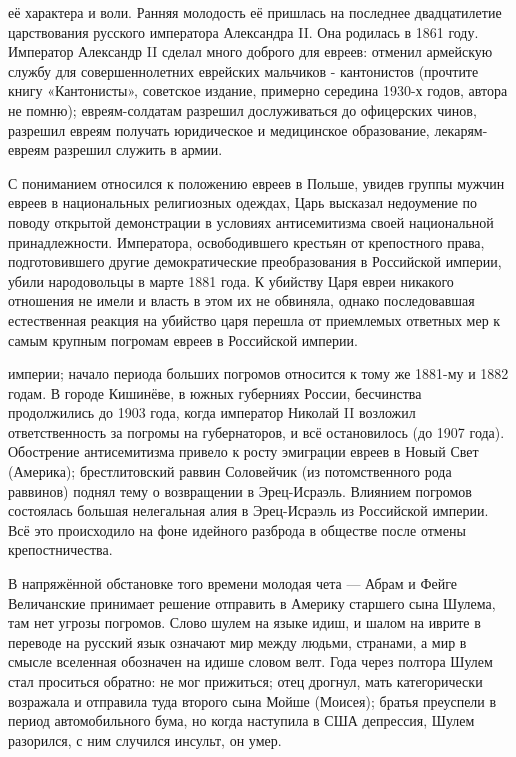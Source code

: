 её характера и воли. Ранняя молодость её пришлась на последнее двадцатилетие царствования русского императора Александра II. Она родилась в 1861 году. Император Александр II сделал много доброго для евреев: отменил армейскую службу для совершеннолетних еврейских мальчиков - кантонистов (прочтите книгу «Кантонисты», советское издание, примерно середина 1930-х годов, автора не помню); евреям-солдатам разрешил дослуживаться до офицерских чинов, разрешил евреям получать юридическое и медицинское образование, лекарям-евреям разрешил служить в армии.

С пониманием относился к положению евреев в Польше, увидев группы мужчин евреев в национальных религиозных одеждах, Царь высказал недоумение по поводу открытой демонстрации в условиях антисемитизма своей национальной принадлежности. Императора, освободившего крестьян от крепостного права, подготовившего другие демократические преобразования в Российской империи, убили народовольцы в марте 1881 года. К убийству Царя евреи никакого отношения не имели и власть в этом их не обвиняла, однако последовавшая естественная реакция на убийство царя перешла от приемлемых ответных мер к самым крупным погромам евреев в Российской империи.

империи; начало периода больших погромов относится к тому же 1881-му и 1882 годам. В городе Кишинёве, в южных губерниях России, бесчинства продолжились до 1903 года, когда император Николай II возложил ответственность за погромы на губернаторов, и всё остановилось (до 1907 года). Обострение антисемитизма привело к росту эмиграции евреев в Новый Свет (Америка); брестлитовский раввин Соловейчик (из потомственного рода раввинов) поднял тему о возвращении в Эрец-Исраэль. Влиянием погромов состоялась большая нелегальная алия в Эрец-Исраэль из Российской империи. Всё это происходило на фоне идейного разброда в обществе после отмены крепостничества.

В напряжённой обстановке того времени молодая чета — Абрам и Фейге Величанские принимает решение отправить в Америку старшего сына Шулема, там нет угрозы погромов. Слово шулем на языке идиш, и шалом на иврите в переводе на русский язык означают мир между людьми, странами, а мир в смысле вселенная обозначен на идише словом велт. Года через полтора Шулем стал проситься обратно: не мог прижиться; отец дрогнул, мать категорически возражала и отправила туда второго сына Мойше (Моисея); братья преуспели в период автомобильного бума, но когда наступила в США депрессия, Шулем разорился, с ним случился инсульт, он умер.

